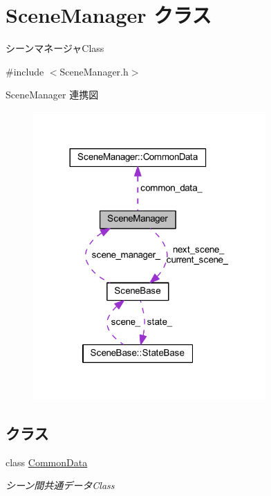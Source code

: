 \hypertarget{class_scene_manager}{}\section{Scene\+Manager クラス}
\label{class_scene_manager}


シーンマネージャ\+Class  




{\ttfamily \#include $<$Scene\+Manager.\+h$>$}



Scene\+Manager 連携図\nopagebreak
\begin{figure}[H]
\begin{center}
\leavevmode
\includegraphics[width=252pt]{class_scene_manager__coll__graph}
\end{center}
\end{figure}
\subsection*{クラス}
\begin{DoxyCompactItemize}
\item 
class \mbox{\hyperlink{class_scene_manager_1_1_common_data}{Common\+Data}}
\begin{DoxyCompactList}\small\item\em シーン間共通データ\+Class \end{DoxyCompactList}\end{DoxyCompactItemize}
